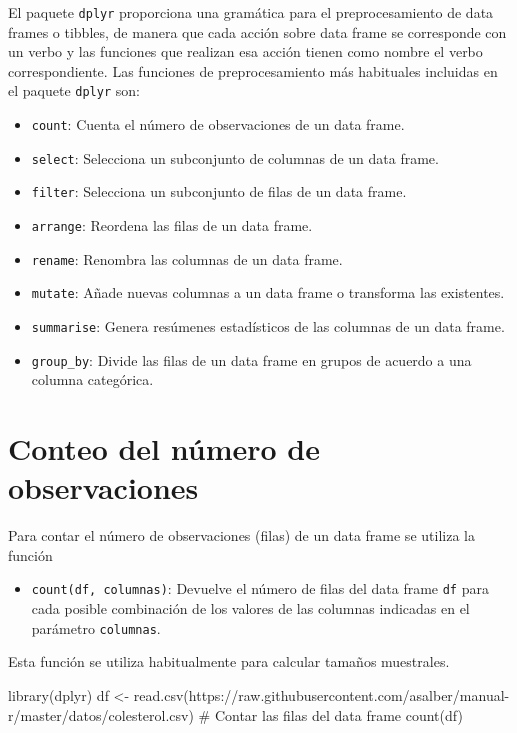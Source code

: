 \documentclass[
  a4paper,
]{scrreport}
\newenvironment{Shaded}{\begin{snugshade}}{\end{snugshade}}
\newcommand{\CommentTok}[1]{\textcolor[rgb]{0.37,0.37,0.37}{#1}}
\newcommand{\FunctionTok}[1]{\textcolor[rgb]{0.28,0.35,0.67}{#1}}
\newcommand{\NormalTok}[1]{\textcolor[rgb]{0.00,0.23,0.31}{#1}}
\newcommand{\OtherTok}[1]{\textcolor[rgb]{0.00,0.23,0.31}{#1}}
\newcommand{\StringTok}[1]{\textcolor[rgb]{0.13,0.47,0.30}{#1}}
\providecommand{\tightlist}{%
  \setlength{\itemsep}{0pt}\setlength{\parskip}{0pt}}\usepackage{longtable,booktabs,array}
\theoremstyle{definition}
\theoremstyle{definition}
\theoremstyle{remark}
\begin{document}
El paquete \texttt{dplyr} proporciona una gramática para el
preprocesamiento de data frames o tibbles, de manera que cada acción
sobre data frame se corresponde con un verbo y las funciones que
realizan esa acción tienen como nombre el verbo correspondiente. Las
funciones de preprocesamiento más habituales incluidas en el paquete
\texttt{dplyr} son:

\begin{itemize}
\tightlist
\item
  \texttt{count}: Cuenta el número de observaciones de un data frame.
\item
  \texttt{select}: Selecciona un subconjunto de columnas de un data
  frame.
\item
  \texttt{filter}: Selecciona un subconjunto de filas de un data frame.
\item
  \texttt{arrange}: Reordena las filas de un data frame.
\item
  \texttt{rename}: Renombra las columnas de un data frame.
\item
  \texttt{mutate}: Añade nuevas columnas a un data frame o transforma
  las existentes.
\item
  \texttt{summarise}: Genera resúmenes estadísticos de las columnas de
  un data frame.
\item
  \texttt{group\_by}: Divide las filas de un data frame en grupos de
  acuerdo a una columna categórica.
\end{itemize}

\hypertarget{conteo-del-nuxfamero-de-observaciones}{%
\section{Conteo del número de
observaciones}\label{conteo-del-nuxfamero-de-observaciones}}

Para contar el número de observaciones (filas) de un data frame se
utiliza la función

\begin{itemize}
\tightlist
\item
  \texttt{count(df,\ columnas)}: Devuelve el número de filas del data
  frame \texttt{df} para cada posible combinación de los valores de las
  columnas indicadas en el parámetro \texttt{columnas}.
\end{itemize}

Esta función se utiliza habitualmente para calcular tamaños muestrales.

\begin{Shaded}
\begin{Highlighting}[]
\FunctionTok{library}\NormalTok{(dplyr)}
\NormalTok{df }\OtherTok{\textless{}{-}} \FunctionTok{read.csv}\NormalTok{(}\StringTok{\textquotesingle{}https://raw.githubusercontent.com/asalber/manual{-}r/master/datos/colesterol.csv\textquotesingle{}}\NormalTok{)}
\CommentTok{\# Contar las filas del data frame}
\FunctionTok{count}\NormalTok{(df)}
\end{Highlighting}
\end{Shaded}
\end{document}
